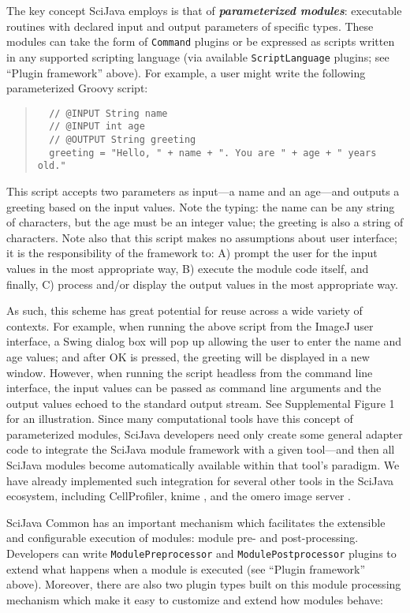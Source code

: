 \documentclass{bmcart}
\begin{document}
The key concept SciJava employs is that of \textbf{\textit{parameterized
modules}}: executable routines with declared input and output parameters of
specific types. These modules can take the form of \texttt{Command} plugins or
be expressed as scripts written in any supported scripting language (via
available \texttt{ScriptLanguage} plugins; see ``Plugin framework'' above). For
example, a user might write the following parameterized Groovy script:

\begin{quote}
  \small
  \begin{verbatim}
  // @INPUT String name
  // @INPUT int age
  // @OUTPUT String greeting
  greeting = "Hello, " + name + ". You are " + age + " years old."\end{verbatim}
\end{quote}

This script accepts two parameters as input---a name and an age---and outputs a
greeting based on the input values. Note the typing: the name can be any string
of characters, but the age must be an integer value; the greeting is also a
string of characters. Note also that this script makes no assumptions about
user interface; it is the responsibility of the framework to: A) prompt the
user for the input values in the most appropriate way, B) execute the module
code itself, and finally, C) process and/or display the output values in the
most appropriate way.

As such, this scheme has great potential for reuse across a wide
variety of contexts. For example, when running the above script from
the ImageJ user interface, a Swing dialog box will pop up allowing the
user to enter the name and age values; and after OK is pressed, the
greeting will be displayed in a new window. However, when running the
script headless from the command line interface, the input values can be
passed as command line arguments and the output values echoed to the
standard output stream. See Supplemental Figure 1 for an
illustration. Since many computational tools have this concept of
parameterized modules, SciJava developers need only create some general
adapter code to integrate the SciJava module framework with a given
tool---and then all SciJava modules become automatically available
within that tool's paradigm. We have already implemented such
integration for several other tools in the SciJava ecosystem, including
CellProfiler, \acrshort{knime} \cite{knip}, and the \acrshort{omero} image
server \cite{omero}.

SciJava Common has an important mechanism which facilitates the extensible and
configurable execution of modules: module pre- and post-processing. Developers
can write \texttt{ModulePreprocessor} and \texttt{ModulePostprocessor} plugins
to extend what happens when a module is executed (see ``Plugin framework''
above). Moreover, there are also two plugin types built on this module
processing mechanism which make it easy to customize and extend how modules
behave:
\end{document}
